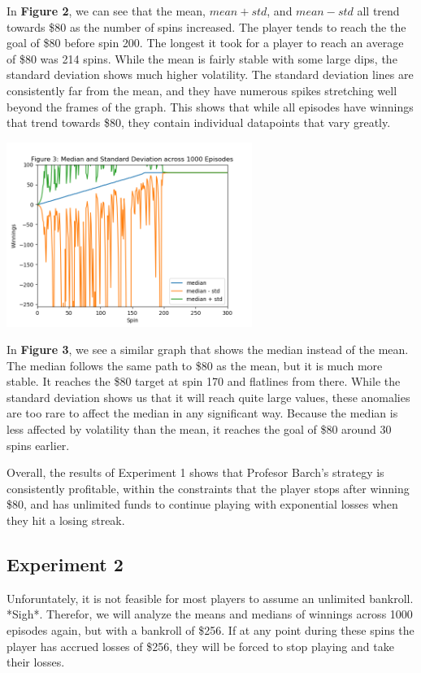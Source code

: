 \documentclass[
	letterpaper, %
]{jdf}
\begin{document}
In \textbf{Figure 2}, we can see that the mean, \(mean + std\), and \(mean - std\) all trend towards \$80 as the number of spins increased.
The player tends to reach the the goal of \$80 before spin 200. 
The longest it took for a player to reach an average of \$80 was 214 spins.
While the mean is fairly stable with some large dips, the standard deviation shows much higher volatility. 
The standard deviation lines are consistently far from the mean, and they have numerous spikes stretching well beyond the frames of the graph.
This shows that while all episodes have winnings that trend towards \$80, they contain individual datapoints that vary greatly.

\begin{jdffigure}
\includegraphics[height=6cm]{Figures/figure3.png}%
\label{fig:figure3}%
\end{jdffigure}

In \textbf{Figure 3}, we see a similar graph that shows the median instead of the mean. 
The median follows the same path to \$80 as the mean, but it is much more stable. 
It reaches the \$80 target at spin 170 and flatlines from there.
While the standard deviation shows us that it will reach quite large values, these anomalies are too rare to affect the median in any significant way.
Because the median is less affected by volatility than the mean, it reaches the goal of \$80 around 30 spins earlier.

Overall, the results of Experiment 1 shows that Profesor Barch's strategy is consistently profitable, within the constraints that the player
stops after winning \$80, and has unlimited funds to continue playing with exponential losses when they hit a losing streak.

\subsection{Experiment 2}
Unforuntately, it is not feasible for most players to assume an unlimited bankroll. *Sigh*. 
Therefor, we will analyze the means and medians of winnings across 1000 episodes again, but with a bankroll of \$256.
If at any point during these spins the player has accrued losses of \$256, they will be forced to stop playing and take their losses.
\end{document}
